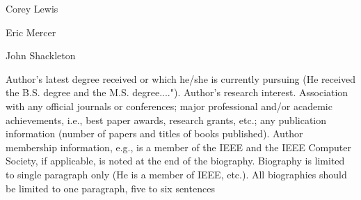\begin{IEEEbiography}{Corey Lewis}{\,}  
\end{IEEEbiography}

\begin{IEEEbiography}{Eric Mercer}{\,}  
\end{IEEEbiography}

\begin{IEEEbiography}{John Shackleton}{\,}  
\end{IEEEbiography}

Author's latest degree received or which he/she is currently pursuing (He received the B.S. degree and the M.S. degree...."). Author's research interest. Association with any official journals or conferences; major professional and/or academic achievements, i.e., best paper awards, research grants, etc.; any publication information (number of papers and titles of books published). Author membership information, e.g., is a member of the IEEE and the IEEE Computer Society, if applicable, is noted at the end of the biography. Biography is limited to single paragraph only (He is a member of IEEE, etc.). All biographies should be limited to one paragraph, five to six sentences